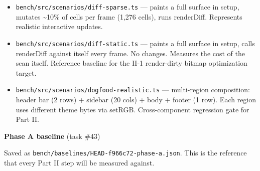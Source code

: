 \begin{itemize}
\tightlist
\item
  \texttt{b\allowbreak{}e\allowbreak{}n\allowbreak{}c\allowbreak{}h\allowbreak{}/\allowbreak{}s\allowbreak{}r\allowbreak{}c\allowbreak{}/\allowbreak{}s\allowbreak{}c\allowbreak{}e\allowbreak{}n\allowbreak{}a\allowbreak{}r\allowbreak{}i\allowbreak{}o\allowbreak{}s\allowbreak{}/\allowbreak{}d\allowbreak{}i\allowbreak{}f\allowbreak{}f\allowbreak{}-\allowbreak{}s\allowbreak{}p\allowbreak{}a\allowbreak{}r\allowbreak{}s\allowbreak{}e\allowbreak{}.\allowbreak{}t\allowbreak{}s} --- paints a full surface in setup, mutates \textasciitilde10\% of cells per frame (1,276 cells), runs renderDiff. Represents realistic interactive updates.
\item
  \texttt{b\allowbreak{}e\allowbreak{}n\allowbreak{}c\allowbreak{}h\allowbreak{}/\allowbreak{}s\allowbreak{}r\allowbreak{}c\allowbreak{}/\allowbreak{}s\allowbreak{}c\allowbreak{}e\allowbreak{}n\allowbreak{}a\allowbreak{}r\allowbreak{}i\allowbreak{}o\allowbreak{}s\allowbreak{}/\allowbreak{}d\allowbreak{}i\allowbreak{}f\allowbreak{}f\allowbreak{}-\allowbreak{}s\allowbreak{}t\allowbreak{}a\allowbreak{}t\allowbreak{}i\allowbreak{}c\allowbreak{}.\allowbreak{}t\allowbreak{}s} --- paints a full surface in setup, calls renderDiff against itself every frame. No changes. Measures the cost of the scan itself. Reference baseline for the II-1 render-dirty bitmap optimization target.
\item
  \texttt{b\allowbreak{}e\allowbreak{}n\allowbreak{}c\allowbreak{}h\allowbreak{}/\allowbreak{}s\allowbreak{}r\allowbreak{}c\allowbreak{}/\allowbreak{}s\allowbreak{}c\allowbreak{}e\allowbreak{}n\allowbreak{}a\allowbreak{}r\allowbreak{}i\allowbreak{}o\allowbreak{}s\allowbreak{}/\allowbreak{}d\allowbreak{}o\allowbreak{}g\allowbreak{}f\allowbreak{}o\allowbreak{}o\allowbreak{}d\allowbreak{}-\allowbreak{}r\allowbreak{}e\allowbreak{}a\allowbreak{}l\allowbreak{}i\allowbreak{}s\allowbreak{}t\allowbreak{}i\allowbreak{}c\allowbreak{}.\allowbreak{}t\allowbreak{}s} --- multi-region composition: header bar (2 rows) + sidebar (20 cols) + body + footer (1 row). Each region uses different theme bytes via setRGB. Cross-component regression gate for Part II.
\end{itemize}

\textbf{Phase A baseline} (task \#43)

Saved as \texttt{b\allowbreak{}e\allowbreak{}n\allowbreak{}c\allowbreak{}h\allowbreak{}/\allowbreak{}b\allowbreak{}a\allowbreak{}s\allowbreak{}e\allowbreak{}l\allowbreak{}i\allowbreak{}n\allowbreak{}e\allowbreak{}s\allowbreak{}/\allowbreak{}H\allowbreak{}E\allowbreak{}A\allowbreak{}D\allowbreak{}-\allowbreak{}f\allowbreak{}9\allowbreak{}6\allowbreak{}6\allowbreak{}c\allowbreak{}7\allowbreak{}2\allowbreak{}-\allowbreak{}p\allowbreak{}h\allowbreak{}a\allowbreak{}s\allowbreak{}e\allowbreak{}-\allowbreak{}a\allowbreak{}.\allowbreak{}j\allowbreak{}s\allowbreak{}o\allowbreak{}n}. This is the reference that every Part II step will be measured against.

